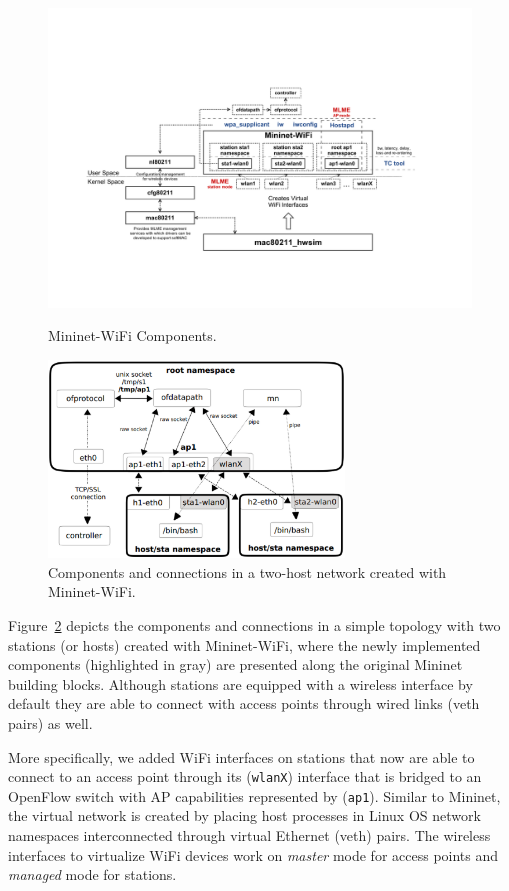 \begin{figure}[!t]
  \centering
{\includegraphics[trim=3.7cm 5cm 2.1cm 7.8cm,clip,width=1.1\textwidth]{Pictures/components}}
  \caption{Mininet-WiFi Components.}
   \label{flowchart}
\end{figure}

\begin{figure}[!t]
\centering
\includegraphics[width=0.7\textwidth]{Pictures/arch.eps}
\caption{Components and connections in a two-host network created with Mininet-WiFi.}
\label{fig:arch}
\end{figure}

Figure~\ref{fig:arch} depicts the components and connections in a simple topology with two stations (or hosts) created with Mininet-WiFi, where the newly implemented components (highlighted in gray) are presented along the original Mininet building blocks. Although stations are equipped with a wireless interface by default they are able to connect with access points through wired links (veth pairs) as well.  

More specifically, we added WiFi interfaces on stations that now are able to connect to an access point through its (\texttt{wlanX}) interface that is bridged to an OpenFlow switch with AP capabilities represented by (\texttt{ap1}). 
Similar to Mininet, the virtual network is created by placing host processes in Linux OS network namespaces interconnected through virtual Ethernet (veth) pairs. The wireless interfaces to virtualize WiFi devices work on \textit{master} mode for access points and \textit{managed} mode for stations.

